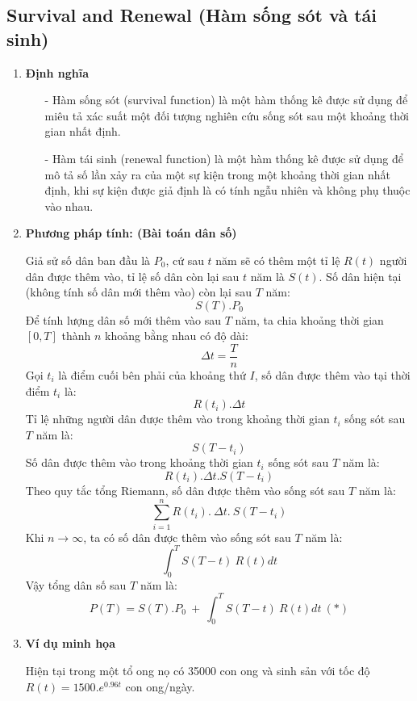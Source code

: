 \documentclass[12pt,a4paper]{article}
\begin{document}
\subsection{Survival and Renewal (Hàm sống sót và tái sinh)}
\begin{enumerate}[a/]
	\item \textbf{Định nghĩa}
	      \begin{itemize}
		      \item[-] Hàm sống sót (survival function) là một hàm thống kê được sử dụng để miêu tả xác suất một đối tượng nghiên cứu sống sót sau một khoảng thời gian nhất định.
		      \item[-] Hàm tái sinh (renewal function) là một hàm thống kê được sử dụng để mô tả số lần xảy ra của một sự kiện trong một khoảng thời gian nhất định, khi sự kiện được giả định là có tính ngẫu nhiên và không phụ thuộc vào nhau.
	      \end{itemize}
	\item \textbf{Phương pháp tính: (Bài toán dân số)}
	      \begin{flushleft}
		      Giả sử số dân ban đầu là $P_0$, cứ sau $t$ năm sẽ có thêm một tỉ lệ $R(t)$ người dân được thêm vào, tỉ lệ số dân còn lại sau $t$ năm là $S(t)$.
		      Số dân hiện tại (không tính số dân mới thêm vào) còn lại sau $T$ năm:
		      $$S(T).P_0$$
		      Để tính lượng dân số mới thêm vào sau $T$ năm, ta chia khoảng thời gian $\left[0,T\right]$ thành $n$ khoảng bằng nhau có độ dài:
		      $$\Delta t=\frac{T}{n}$$
		      Gọi $t_i$ là điểm cuối bên phải của khoảng thứ $I$, số dân được thêm vào tại thời điểm $t_i$ là:
		      $$R(t_i).\Delta t$$
		      Tỉ lệ những người dân được thêm vào trong khoảng thời gian $t_i$ sống sót sau $T$ năm là:
		      $$S(T-t_i)$$
		      Số dân được thêm vào trong khoảng thời gian $t_i$ sống sót sau $T$ năm là:
		      $$R(t_i).\Delta t.S(T-t_i)$$
		      Theo quy tắc tổng Riemann, số dân được thêm vào sống sót sau $T$ năm là:
		      $$\sum_{i=1}^{n}R(t_i).\ \Delta t.\ S(T-t_i)$$
		      Khi $n \to \infty$, ta có số dân được thêm vào sống sót sau $T$ năm là:
		      $$\int_{0}^{T}S(T-t)\ R(t)dt$$
		      Vậy tổng dân số sau $T$ năm là:
		      $$P(T)=S(T).P_0\ +\ \int_{0}^{T}S(T-t)\ R(t)dt\ (*)$$
	      \end{flushleft}
	      \newpage
	\item \textbf{Ví dụ minh họa}
	      \begin{flushleft}
		      Hiện tại trong một tổ ong nọ có 35000 con ong và sinh sản với tốc độ
		      $R(t)=1500.e^{0.96t}$ con ong/ngày.

\end{flushleft}
\end{enumerate}
\end{document}
